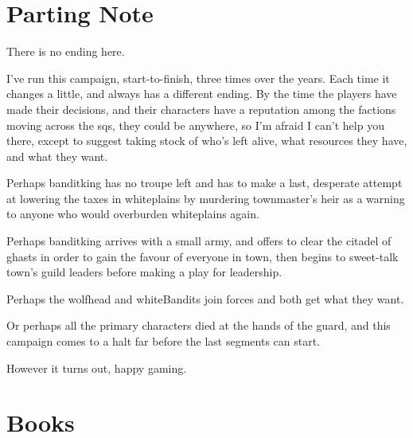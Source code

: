\section*{Parting Note}

There is no ending here.

I've run this campaign, start-to-finish, three times over the years.
Each time it changes a little, and always has a different ending.
By the time the players have made their decisions, and their characters have a reputation among the factions moving across the \glspl{sq}, they could be anywhere, so I'm afraid I can't help you there, except to suggest taking stock of who's left alive, what resources they have, and what they want.

Perhaps \gls{banditking} has no troupe left and has to make a last, desperate attempt at lowering the taxes in \gls{whiteplains} by murdering \gls{townmaster}'s heir as a warning to anyone who would overburden \gls{whiteplains} again.

Perhaps \gls{banditking} arrives with a small army, and offers to clear the citadel of ghasts in order to gain the favour of everyone in \gls{town}, then begins to sweet-talk \gls{town}'s guild leaders before making a play for leadership.

Perhaps the \gls{wolfhead} and \gls{whiteBandits} join forces and both get what they want.

Or perhaps all the primary characters died at the hands of the \gls{guard}, and this campaign comes to a halt far before the last \glspl{segment} can start.

However it turns out, happy gaming.

\section{Books}
\label{bookAppendix}

